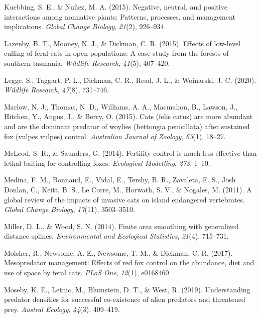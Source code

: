 \documentclass[]{elsarticle} %
\begin{document}
\leavevmode\hypertarget{ref-kuebbing2015}{}%
Kuebbing, S. E., \& Nuñez, M. A. (2015). Negative, neutral, and positive interactions among nonnative plants: Patterns, processes, and management implications. \emph{Global Change Biology}, \emph{21}(2), 926--934.

\leavevmode\hypertarget{ref-lazenby2015}{}%
Lazenby, B. T., Mooney, N. J., \& Dickman, C. R. (2015). Effects of low-level culling of feral cats in open populations: A case study from the forests of southern tasmania. \emph{Wildlife Research}, \emph{41}(5), 407--420.

\leavevmode\hypertarget{ref-legge2020}{}%
Legge, S., Taggart, P. L., Dickman, C. R., Read, J. L., \& Woinarski, J. C. (2020). \emph{Wildlife Research}, \emph{47}(8), 731--746.

\leavevmode\hypertarget{ref-marlow2015}{}%
Marlow, N. J., Thomas, N. D., Williams, A. A., Macmahon, B., Lawson, J., Hitchen, Y., Angus, J., \& Berry, O. (2015). Cats (felis catus) are more abundant and are the dominant predator of woylies (bettongia penicillata) after sustained fox (vulpes vulpes) control. \emph{Australian Journal of Zoology}, \emph{63}(1), 18--27.

\leavevmode\hypertarget{ref-mcleod2014}{}%
McLeod, S. R., \& Saunders, G. (2014). Fertility control is much less effective than lethal baiting for controlling foxes. \emph{Ecological Modelling}, \emph{273}, 1--10.

\leavevmode\hypertarget{ref-medina2011}{}%
Medina, F. M., Bonnaud, E., Vidal, E., Tershy, B. R., Zavaleta, E. S., Josh Donlan, C., Keitt, B. S., Le Corre, M., Horwath, S. V., \& Nogales, M. (2011). A global review of the impacts of invasive cats on island endangered vertebrates. \emph{Global Change Biology}, \emph{17}(11), 3503--3510.

\leavevmode\hypertarget{ref-miller2014}{}%
Miller, D. L., \& Wood, S. N. (2014). Finite area smoothing with generalized distance splines. \emph{Environmental and Ecological Statistics}, \emph{21}(4), 715--731.

\leavevmode\hypertarget{ref-molsher2017}{}%
Molsher, R., Newsome, A. E., Newsome, T. M., \& Dickman, C. R. (2017). Mesopredator management: Effects of red fox control on the abundance, diet and use of space by feral cats. \emph{PLoS One}, \emph{12}(1), e0168460.

\leavevmode\hypertarget{ref-moseby2019}{}%
Moseby, K. E., Letnic, M., Blumstein, D. T., \& West, R. (2019). Understanding predator densities for successful co-existence of alien predators and threatened prey. \emph{Austral Ecology}, \emph{44}(3), 409--419.
\end{document}
